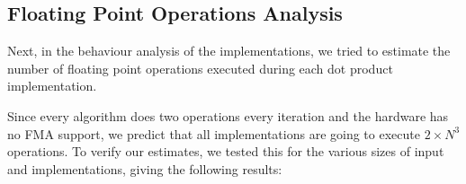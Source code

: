 \documentclass[twoside,twocolumn]{article}
\begin{document}
\subsection{Floating Point Operations Analysis}

Next, in the behaviour analysis of the implementations, we tried to estimate the number of floating point operations executed during each dot product implementation.

Since every algorithm does two operations every iteration and the hardware has no FMA support, we predict that all implementations are going to execute $2 \times N^{3}$ operations. To verify our estimates, we tested this for the various sizes of input and implementations, giving the following results:

\begin{table}[h]
\caption{Number of floating point operations executed.}
\label{tab:fpresults}
\end{table}
\end{document}

